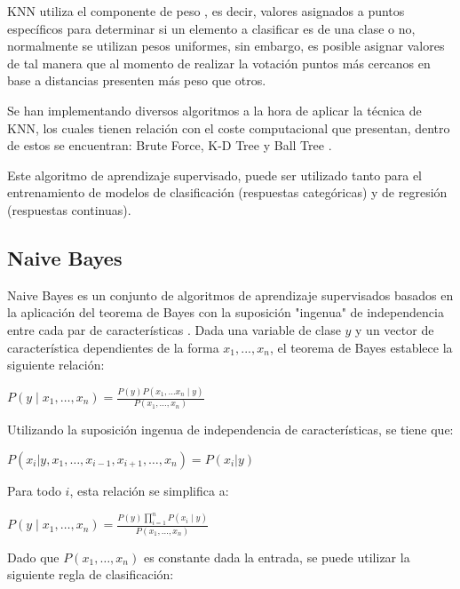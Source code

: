 KNN utiliza el componente de peso \cite{TAN2005667}, es decir, valores asignados a puntos específicos para determinar si un elemento a clasificar es de una clase o no, normalmente se utilizan pesos uniformes, sin embargo, es posible asignar valores de tal manera que al momento de realizar la votación puntos más cercanos en base a distancias presenten más peso que otros.

Se han implementando diversos algoritmos a la hora de aplicar la técnica de KNN, los cuales tienen relación con el coste computacional que presentan, dentro de estos se encuentran: Brute Force, K-D Tree y Ball Tree \cite{pedregosa2011scikit}.

Este algoritmo de aprendizaje supervisado, puede ser utilizado tanto para el entrenamiento de modelos de clasificación (respuestas categóricas) y de regresión (respuestas continuas).

\subsection{Naive Bayes}

Naive Bayes es un conjunto de algoritmos de aprendizaje supervisados basados en la aplicación del teorema de Bayes con la suposición "ingenua" de independencia entre cada par de características \cite{zhang2004optimality}. Dada una variable de clase $y$ y un vector de característica dependientes de la forma $x_1,..., x_n$, el teorema de Bayes establece la siguiente relación:

\begin{center}
	$P(y \mid x_1, \dots, x_n) = \frac{P(y) P(x_1, \dots x_n \mid y)} {P(x_1, \dots, x_n)}
	$
\end{center}

Utilizando la suposición ingenua de independencia de características, se tiene que:

\begin{center}
	$P(x_i | y, x_1, \dots, x_{i-1}, x_{i+1}, \dots, x_n) = P(x_i | y)$
\end{center}

Para todo $i$, esta relación se simplifica a:

\begin{center}
	$P(y \mid x_1, \dots, x_n) = \frac{P(y) \prod_{i=1}^{n} P(x_i \mid y)} {P(x_1, \dots, x_n)}$
\end{center}

Dado que $P(x_1, \dots, x_n)$ es constante dada la entrada, se puede utilizar la siguiente regla de clasificación:

